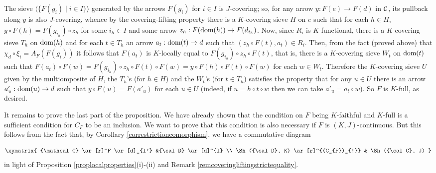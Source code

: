 \documentclass[a4paper,12pt]{article}
\begin{document}
\begin{proofs}
The sieve $\langle \{F(g_i) \mid i\in I\}\rangle $ generated by the arrows $F(g_i)$ for $i\in I$ is $J$-covering; so, for any arrow $y:F(e)\to F(d)$ in $\cal C$, its pullback along $y$ is also $J$-covering, whence by the covering-lifting property there is a $K$-covering sieve $H$ on $e$ such that for each $h\in H$, $y\circ F(h)=F(g_{i_{h}})\circ z_{h}$ for some $i_{h}\in I$ and some arrow $z_{h}:F(\textup{dom}(h))\to F(d_{i_{h}})$. Now, since $R_{i}$ is $K$-functional, there is a $K$-covering sieve $T_{h}$ on $\textup{dom}(h)$ and for each $t\in T_{h}$ an arrow $a_{t}:\textup{dom}(t)\to d$ such that $(z_{h}\circ F(t), a_{t})\in R_{i}$. Then, from the fact (proved above) that $\chi_{d}\circ \xi_{i}=A_{F}(F(g_{i}))$ it follows that $F(a_{t})$ is $K$-locally equal to $F(g_{i_{h}})\circ z_{h}\circ F(t)$, that is, there is a $K$-covering sieve $W_{t}$ on $\textup{dom}(t)$ such that $F(a_{t})\circ F(w)=F(g_{i_{h}})\circ z_{h}\circ F(t)\circ F(w)=y\circ F(h)\circ F(t)\circ F(w)$ for each $w\in W_{t}$. Therefore the $K$-covering sieve $U$ given by the multiomposite of $H$, the $T_{h}$'s (for $h\in H$) and the $W_{t}$'s (for $t\in T_{h}$) satisfies the property that for any $u\in U$ there is an arrow $a'_{u}:\textup{dom}(u)\to d$ such that $y\circ F(u)=F(a'_{u})$ for each $u\in U$ (indeed, if $u=h\circ t\circ w$ then we can take $a'_{u}=a_{t}\circ w$). So $F$ is $K$-full, as desired.   

It remains to prove the last part of the proposition. We have already shown that the condition on $F$ being $K$-faithful and $K$-full is a sufficient condition for $C_{F}$ to be an inclusion. We want to prove that this condition is also necessary if $F$ is $(K, J)$-continuous. But this follows from the fact that, by Corollary \ref{correstrictioncomorphism}, we have a commutative diagram

		$$
\xymatrix{
	{\mathcal C} \ar[r]^F \ar[d]_{l'} &{\cal D} \ar[d]^{l} \\
	\Sh({\cal D}, K) \ar[r]^{(C_{F})_{!}} & \Sh({\cal C}, J)
}
$$ 
in light of Proposition \ref{proplocalproperties}(i)-(ii) and Remark \ref{remcoveringliftingstrictequality}. 
\end{proofs}
\end{document}
